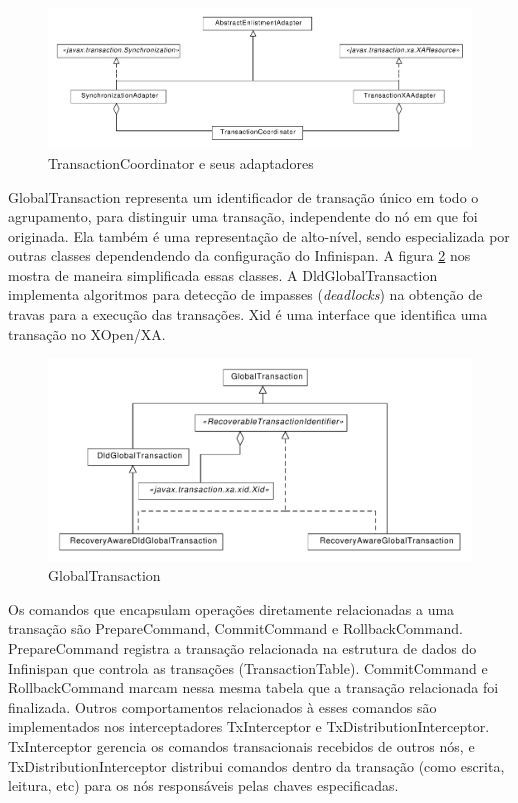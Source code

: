 \documentclass[11pt,twoside,a4paper]{book}
\begin{document}
\begin{figure}
  \centering
  \includegraphics[width=\textwidth]{transaction_coordinator} 
  \caption{TransactionCoordinator e seus adaptadores}
  \label{fig:transaction_coordinator} 
\end{figure}

GlobalTransaction representa um identificador de transação único em todo o agrupamento, para distinguir uma transação, independente do nó em que foi originada. Ela também é uma representação de alto-nível, sendo especializada por outras classes dependendendo da configuração do Infinispan. A figura \ref{fig:global_transaction} nos mostra de maneira simplificada essas classes. A DldGlobalTransaction implementa algoritmos para detecção de impasses (\emph{deadlocks}) na obtenção de travas para a execução das transações. Xid é uma interface que identifica uma transação no XOpen/XA.

\begin{figure}
  \centering
  \includegraphics[width=\textwidth]{global_transaction} 
  \caption{GlobalTransaction}
  \label{fig:global_transaction} 
\end{figure}

Os comandos que encapsulam operações diretamente relacionadas a uma transação são PrepareCommand, CommitCommand e RollbackCommand. PrepareCommand registra a transação relacionada na estrutura de dados do Infinispan que controla as transações (TransactionTable). CommitCommand e RollbackCommand marcam nessa mesma tabela que a transação relacionada foi finalizada. Outros comportamentos relacionados à esses comandos são implementados nos interceptadores TxInterceptor e TxDistributionInterceptor. TxInterceptor gerencia os comandos transacionais recebidos de outros nós, e TxDistributionInterceptor distribui comandos dentro da transação (como escrita, leitura, etc) para os nós responsáveis pelas chaves especificadas.
\end{document}
